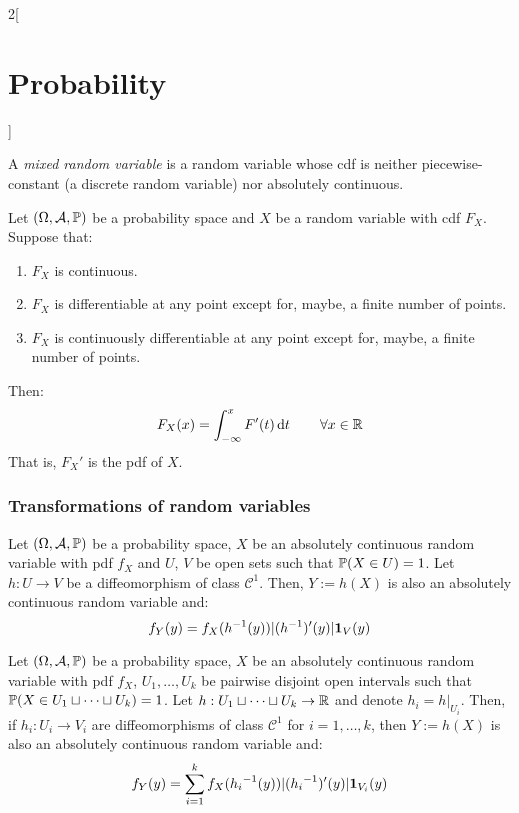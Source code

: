 \documentclass[../../../main.tex]{subfiles}
\begin{document}
\begin{multicols}{2}[\section{Probability}]
\begin{definition}
  \end{definition}
  \begin{definition}
    A \emph{mixed random variable} is a random variable whose cdf is neither piecewise-constant (a discrete random variable) nor absolutely  continuous.
  \end{definition}
  \begin{theorem}
    Let $(\Omega,\mathcal{A},\mathbb{P})$ be a probability space and $X$ be a random variable with cdf $F_X$. Suppose that:
    \begin{enumerate}
      \item $F_X$ is continuous.
      \item $F_X$ is differentiable at any point except for, maybe, a finite number of points.
      \item $F_X$ is continuously differentiable at any point except for, maybe, a finite number of points.
    \end{enumerate}
    Then: $$F_X(x)=\int_{-\infty}^xF'(t)\dd{t}\qquad\forall x\in\mathbb{R}$$
    That is, ${F_X}'$ is the pdf of $X$.
  \end{theorem}
  \subsubsection{Transformations of random variables}
  \begin{proposition}
    Let $(\Omega,\mathcal{A},\mathbb{P})$ be a probability space, $X$ be an absolutely continuous random variable with pdf $f_X$ and $U$, $V$ be open sets such that $\mathbb{P}(X\in U)=1$. Let $h:U\rightarrow V$ be a diffeomorphism of class $\mathcal{C}^1$. Then, $Y:=h(X)$ is also an absolutely continuous random variable and: $$f_Y(y)=f_X(h^{-1}(y))|(h^{-1})'(y)|\boldsymbol{\mathrm{1}}_V(y)$$
  \end{proposition}
  \begin{proposition}
    Let $(\Omega,\mathcal{A},\mathbb{P})$ be a probability space, $X$ be an absolutely continuous random variable with pdf $f_X$, $U_1,\ldots, U_k$ be pairwise disjoint open intervals such that $\mathbb{P}(X\in U_1\sqcup \cdots\sqcup U_k)=1$. Let $h:U_1\sqcup \cdots\sqcup U_k\rightarrow \mathbb{R}$ and denote $h_i=h|_{U_i}$. Then, if $h_i:U_i\rightarrow V_i$ are  diffeomorphisms of class $\mathcal{C}^1$ for $i=1,\ldots,k$, then $Y:=h(X)$ is also an absolutely continuous random variable and: $$f_Y(y)=\sum_{i=1}^kf_X({h_i}^{-1}(y))|({h_i}^{-1})'(y)|\boldsymbol{\mathrm{1}}_{V_i}(y)$$
  \end{proposition}

\end{multicols}
\end{document}
